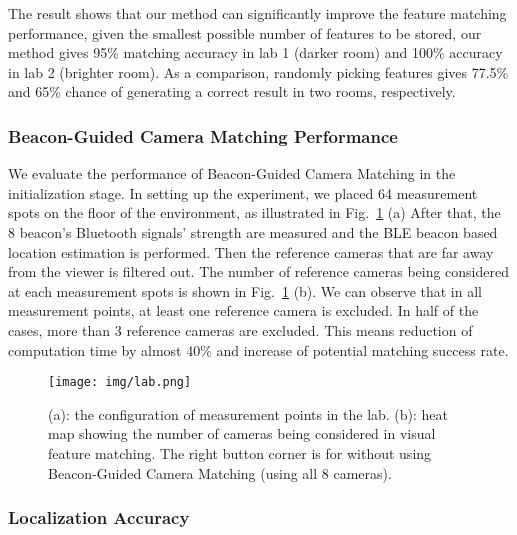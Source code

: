 The result shows that our method can significantly improve the feature matching performance, given the smallest possible number of features to be stored, our method gives 95\% matching accuracy in lab 1 (darker room) and 100\% accuracy in lab 2 (brighter room). As a comparison, randomly picking features gives 77.5\% and 65\% chance of generating a correct result in two rooms, respectively.

\subsubsection{Beacon-Guided Camera Matching Performance}
We evaluate the performance of Beacon-Guided Camera Matching in the initialization stage. In setting up the experiment, we placed 64 measurement spots on the floor of the environment, as illustrated in Fig.~\ref{fig:lab} (a) After that, the 8 beacon's Bluetooth signals' strength are measured and the BLE beacon based location estimation is performed. Then the reference cameras that are far away from the viewer is filtered out. The number of reference cameras being considered at each measurement spots is shown in Fig.~\ref{fig:lab} (b). We can observe that in all measurement points, at least one reference camera is excluded. In half of the cases, more than 3 reference cameras are excluded. This means reduction of computation time by almost 40\% and increase of potential matching success rate.

\begin{figure}[!htb]
	\begin{center}
		\texttt{[image: img/lab.png]}
		\caption{(a): the configuration of measurement points in the lab. (b): heat map showing the number of cameras being considered in visual feature matching. The right button corner is for without using Beacon-Guided Camera Matching (using all 8 cameras).}
		\label{fig:lab}
	\end{center}
	\vspace{-1.5em}
\end{figure}

\subsubsection{Localization Accuracy}

